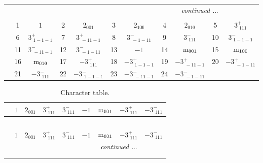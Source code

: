 \documentclass[fleqn,10pt,landscape]{article}
\begin{document}
\begin{itemize}
\begin{center}
\begin{longtable}{c|cc|cc|cc|cc|cc}
 \hline \hline
\multicolumn{10}{r}{\footnotesize\it continued ...} \\ \endfoot

 \hline \hline
\multicolumn{10}{r}{} \\ \endlastfoot

 & 1 & $1$ & 2 & $2{}_{001}$ & 3 & $2{}_{100}$ & 4 & $2{}_{010}$ & 5 & $3^{+}_{\,\,111}$ \\
& 6 & $3^{+}_{\,\,1-1-1}$ & 7 & $3^{+}_{\,\,-11-1}$ & 8 & $3^{+}_{\,\,-1-11}$ & 9 & $3^{-}_{\,\,111}$ & 10 & $3^{-}_{\,\,1-1-1}$ \\
& 11 & $3^{-}_{\,\,-11-1}$ & 12 & $3^{-}_{\,\,-1-11}$ & 13 & $-1$ & 14 & ${\rm m}_{001}$ & 15 & ${\rm m}_{100}$ \\
& 16 & ${\rm m}_{010}$ & 17 & $-3^{+}_{\,\,111}$ & 18 & $-3^{+}_{\,\,1-1-1}$ & 19 & $-3^{+}_{\,\,-11-1}$ & 20 & $-3^{+}_{\,\,-1-11}$ \\
& 21 & $-3^{-}_{\,\,111}$ & 22 & $-3^{-}_{\,\,1-1-1}$ & 23 & $-3^{-}_{\,\,-11-1}$ & 24 & $-3^{-}_{\,\,-1-11}$ &  &  \\
\end{longtable}
\end{center}
\begin{center}
\renewcommand{\arraystretch}{1.0}
\begin{longtable}{c|rrrrrrrr}
\caption{Character table.}
 \\
 \hline \hline
 & $ 1 $ & $ 2{}_{001} $ & $ 3^{+}_{\,\,111} $ & $ 3^{-}_{\,\,111} $ & $ -1 $ & $ {\rm m}_{001} $ & $ -3^{+}_{\,\,111} $ & $ -3^{-}_{\,\,111} $ \\ \hline \endfirsthead

\multicolumn{8}{l}{\tablename\ \thetable{}} \\
 \hline \hline
 & $ 1 $ & $ 2{}_{001} $ & $ 3^{+}_{\,\,111} $ & $ 3^{-}_{\,\,111} $ & $ -1 $ & $ {\rm m}_{001} $ & $ -3^{+}_{\,\,111} $ & $ -3^{-}_{\,\,111} $ \\ \hline \endhead

 \hline \hline
\multicolumn{8}{r}{\footnotesize\it continued ...} \\ \endfoot

 \hline \hline
\multicolumn{8}{r}{} \\ \endlastfoot


\end{longtable}
\end{center}
\end{itemize}
\end{document}

